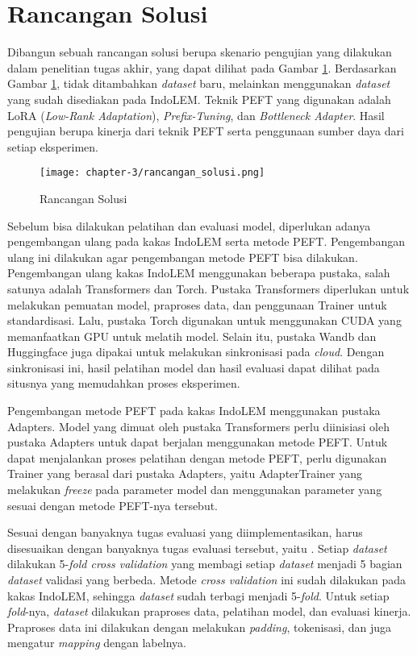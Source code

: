 \section{Rancangan Solusi}
\label{sec:rancangan-solusi}

Dibangun sebuah rancangan solusi berupa skenario pengujian yang dilakukan dalam penelitian tugas akhir, yang dapat dilihat pada Gambar \ref{fig:rancangan-solusi}. Berdasarkan Gambar \ref{fig:rancangan-solusi}, tidak ditambahkan \textit{dataset} baru, melainkan menggunakan \textit{dataset} yang sudah disediakan pada IndoLEM. Teknik PEFT yang digunakan adalah LoRA (\textit{Low-Rank Adaptation}), \textit{Prefix-Tuning}, dan \textit{Bottleneck Adapter}. Hasil pengujian berupa kinerja dari teknik PEFT serta penggunaan sumber daya dari setiap eksperimen.

\begin{figure}[ht]
    \centering
    \texttt{[image: chapter-3/rancangan\_solusi.png]}
    \caption{Rancangan Solusi}
    \label{fig:rancangan-solusi}
\end{figure}

Sebelum bisa dilakukan pelatihan dan evaluasi model, diperlukan adanya pengembangan ulang pada kakas IndoLEM serta metode PEFT. Pengembangan ulang ini dilakukan agar pengembangan metode PEFT bisa dilakukan. Pengembangan ulang kakas IndoLEM  menggunakan beberapa pustaka, salah satunya adalah Transformers dan Torch. Pustaka Transformers diperlukan untuk melakukan pemuatan model, praproses data, dan penggunaan Trainer untuk standardisasi. Lalu, pustaka Torch digunakan untuk menggunakan CUDA yang memanfaatkan GPU untuk melatih model. Selain itu, pustaka Wandb dan Huggingface juga  dipakai untuk melakukan sinkronisasi pada \textit{cloud}. Dengan sinkronisasi ini, hasil pelatihan model dan hasil evaluasi dapat dilihat pada situsnya yang  memudahkan proses eksperimen. 

Pengembangan metode PEFT pada kakas IndoLEM  menggunakan pustaka Adapters. Model yang dimuat oleh pustaka Transformers perlu diinisiasi oleh pustaka Adapters untuk dapat berjalan menggunakan metode PEFT. Untuk dapat menjalankan proses pelatihan dengan metode PEFT, perlu digunakan Trainer yang berasal dari pustaka Adapters, yaitu AdapterTrainer yang  melakukan \textit{freeze} pada parameter model dan  menggunakan parameter yang sesuai dengan metode PEFT-nya tersebut.

Sesuai dengan banyaknya tugas evaluasi yang diimplementasikan, harus disesuaikan dengan banyaknya tugas evaluasi tersebut, yaitu \nlptask. Setiap \textit{dataset}  dilakukan 5-\textit{fold cross validation} yang membagi setiap \textit{dataset} menjadi 5 bagian \textit{dataset} validasi yang berbeda. Metode \textit{cross validation} ini sudah dilakukan pada kakas IndoLEM, sehingga \textit{dataset} sudah terbagi menjadi 5-\textit{fold}. Untuk setiap \textit{fold}-nya, \textit{dataset}  dilakukan praproses data, pelatihan model, dan evaluasi kinerja. Praproses data ini dilakukan dengan melakukan \textit{padding}, tokenisasi, dan juga mengatur \textit{mapping} dengan labelnya. 

